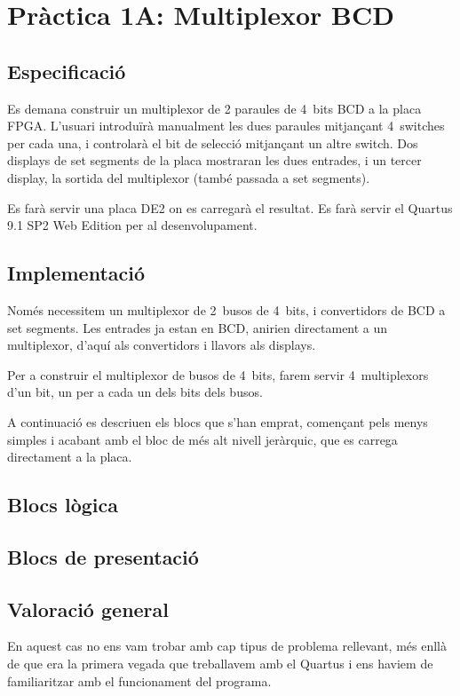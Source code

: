\chapter{Pràctica 1A: Multiplexor BCD}

\section{Especificació}

Es demana construir un multiplexor de 2 paraules de 4~bits BCD a la placa FPGA.
L'usuari introduïrà manualment les dues paraules mitjançant 4~switches per cada
una, i controlarà el bit de selecció mitjançant un altre switch. Dos displays
de set segments de la placa mostraran les dues entrades, i un tercer display,
la sortida del multiplexor (també passada a set segments).

Es farà servir una placa DE2 on es carregarà el resultat. Es farà servir el
Quartus 9.1 SP2 Web Edition per al desenvolupament.

\section{Implementació}

Només necessitem un multiplexor de 2~busos de 4~bits, i convertidors de BCD
a set segments. Les entrades ja estan en BCD, anirien directament a un multiplexor, d'aquí als convertidors i llavors als displays.

Per a construir el multiplexor de busos de 4~bits, farem servir 4~multiplexors d'un
bit, un per a cada un dels bits dels busos.

A continuació es descriuen els blocs que s'han emprat, començant pels menys
simples i acabant amb el bloc de més alt nivell jeràrquic, que es carrega
directament a la placa.

  \cclearpage
\section{Blocs lògica}
  \cclearpage
{}

  \cclearpage
\section{Blocs de presentació}
  \cclearpage
{}

\section{Valoració general}

En aquest cas no ens vam trobar amb cap tipus de problema rellevant, més enllà de que era la primera vegada que treballavem amb el Quartus i ens haviem de familiaritzar amb el funcionament del programa.

